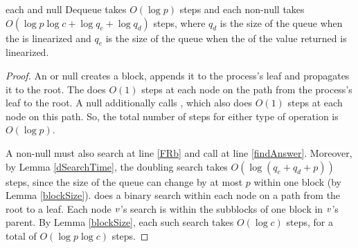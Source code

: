 \begin{mytheorem}\label{enqDeqTime}
each  and null Dequeue takes $O(\log p)$ steps 
and each non-null  takes
$O(\log p\log c + \log q_e+ \log q_d)$ steps,
where $q_d$ is the size of the queue when the  is linearized and 
$q_e$ is the size of the queue when the  of the value returned is linearized.
\end{mytheorem}
\begin{proof}
An  or null  creates a block, appends it to the process's 
leaf and propagates it to the root.  The   does $O(1)$ steps 
at each node on the path from the process's leaf to the root.
A null  additionally calls , which also does $O(1)$ steps
at each node on this path. 
So, the total number of steps for either type of operation is $O(\log p)$.

A non-null  must also search at line \ref{FRb} and call 
at line \ref{findAnswer}.
Moreover, by Lemma \ref{dSearchTime}, the doubling search takes $O(\log(q_e+q_d+p))$ steps,
since the size of the queue can change by at most $p$ within one block (by Lemma \ref{blockSize}).
 does a binary search within each node on a path from the root to a leaf.
Each node $\mbox{\textnormal{\textit{v}}}$'s search is within the subblocks of one block in $\mbox{\textnormal{\textit{v}}}$'s parent.
By Lemma \ref{blockSize}, each such search takes $O(\log c)$ steps, for a total of $O(\log p\log c)$ steps.
\end{proof}
